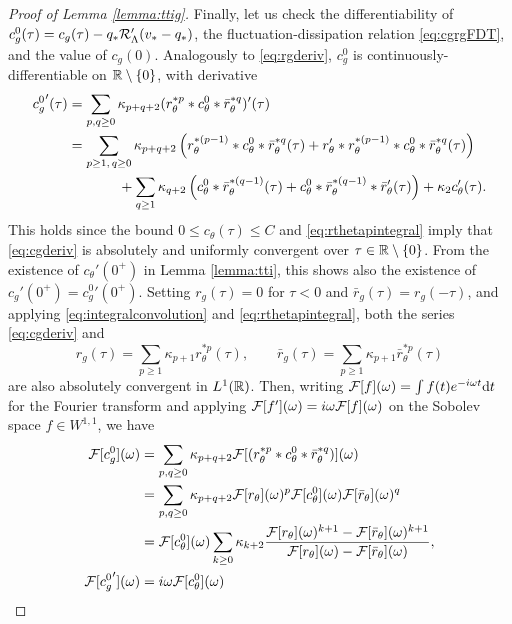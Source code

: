 \begin{proof}[Proof of Lemma \ref{lemma:ttig}]
Finally, let us check the differentiability of $c_g^0(\tau)=c_g(\tau)-q_*\mathcal{R}_{\Lambda}'(v_*-q_*)$,
the fluctuation-dissipation relation \eqref{eq:cgrgFDT}, and the value of
$c_g(0)$. Analogously to \eqref{eq:rgderiv}, $c_g^0$ is continuously-differentiable
on $\mathbb{R} \setminus \{0\}$, with derivative
\begin{align}
{c_g^0}'(\tau)&=
\sum_{p,q \geq 0} \kappa_{p+q+2} (r_\theta^{*p}*c_\theta^0*\bar r_\theta^{*q})'(\tau)\notag\\
&=\sum_{p \geq 1,\,q \geq 0}
\kappa_{p+q+2} \left(r_\theta^{*(p-1)}*c_\theta^0*\bar r_\theta^{*q}(\tau)
+r_\theta'*r_\theta^{*(p-1)}*c_\theta^0*\bar r_\theta^{*q}(\tau)\right)\notag\\
&\hspace{0.5in}+\sum_{q \geq 1} \kappa_{q+2}
\left(c_\theta^0 * \bar r_\theta^{*(q-1)}(\tau)
+c_\theta^0*\bar r_\theta^{*(q-1)} * \bar r_\theta'(\tau)\right)
+\kappa_2 c_\theta'(\tau).\label{eq:cgderiv}
\end{align}
This holds since the bound $0 \leq c_\theta(\tau) \leq C$
and \eqref{eq:rthetapintegral}
imply that \eqref{eq:cgderiv} is absolutely and uniformly convergent over
$\tau \in \mathbb{R} \setminus \{0\}$.
From the existence of $c_\theta'(0^+)$ in Lemma \ref{lemma:tti},
this shows also the existence of $c_g'(0^+)={c_g^0}'(0^+)$. 
Setting $r_g(\tau)=0$ for $\tau<0$ and $\bar r_g(\tau)=r_g(-\tau)$,
and applying \eqref{eq:integralconvolution} and
\eqref{eq:rthetapintegral}, both the series \eqref{eq:cgderiv} and
\[r_g(\tau)=\sum_{p \geq 1} \kappa_{p+1} r_\theta^{*p}(\tau),
\qquad \bar r_g(\tau)=\sum_{p \geq 1} \kappa_{p+1} \bar r_\theta^{*p}(\tau)\]
are also absolutely convergent in $L^1(\mathbb{R})$. Then, writing
$\mathcal{F}[f](\omega)=\int f(t) e^{-i\omega t} \mathrm{d} t$ for the Fourier transform
and applying $\mathcal{F}[f'](\omega)=i\omega \mathcal{F}[f](\omega)$ on the Sobolev space $f
\in W^{1,1}$, we have 
\begin{equation}\label{eq:Fouriercalculations}
\begin{aligned}
\cF[c_g^0](\omega)
&=\sum_{p,q \geq 0} \kappa_{p+q+2}
\cF[(r_\theta^{*p}*c_\theta^0*\bar r_\theta^{*q})](\omega)\\
&=\sum_{p,q \geq 0} \kappa_{p+q+2}
\cF[r_\theta](\omega)^p\cF[c_\theta^0](\omega)\cF[\bar r_\theta](\omega)^q\\
&=\cF[c_\theta^0](\omega)
\sum_{k \geq 0} \kappa_{k+2} \frac{\cF[r_\theta](\omega)^{k+1}
-\cF[\bar r_\theta](\omega)^{k+1}}{\cF[r_\theta](\omega)-\cF[\bar r_\theta](\omega)},\\
\cF[{c_g^0}'](\omega)&=
i\omega \cF[c_\theta^0](\omega)

\end{aligned}
\end{equation}
\end{proof}
